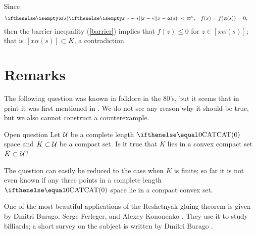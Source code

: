 Since 
\begin{align*}
\dist{x}{\alpha(s)}{}&<\varpi\kappa,
&
f(x)&=f(\alpha(s))=0,
\end{align*}
then the barrier inequality (\ref{barrier}) 
implies that $f(z)\le 0$ for $z\in [x\alpha(s)]$;
that is $[x\alpha(s)]\subset K$, a contradiction.
\qeds

\section{Remarks}

The following question was known in folklore in the 80's,
but it seems that in print
it was first mentioned in \cite{kopecka-reich}. %
We do not see any reason why it should be true, 
but we also cannot construct a counterexample.

\begin{thm}{Open question}
Let $\mathcal{U}$ be a complete length $\CAT0$ space and $K\subset \spc{U}$ be a compact set.
Is it true that $K$ lies in a convex compact set $\bar K\subset\spc{U}$?
\end{thm}

The question can  easily be reduced to the case when $K$ is finite;
so far it is not even known if any three points in a complete length $\CAT0$ space lie in a compact convex set.

One of the most beautiful applications of the Reshetnyak gluing theorem is given by Dmitri Burago,  Serge Ferleger,
and Alexey Kononenko \cite{burago-ferleger-kononenko1998-1,burago-ferleger-kononenko1998-2,burago-ferleger-kononenko1998-3,burago-ferleger-kononenko1998-4}. They use it to study billiards; a short survey on the subject is written by Dmitri Burago \cite{burago-1998}.
